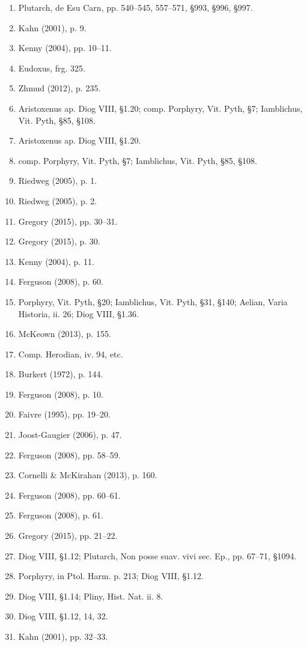 \begin{enumerate}
\item Plutarch, de Esu Carn, pp. 540–545, 557–571, §993, §996, §997.  
\item Kahn (2001), p. 9.  
\item Kenny (2004), pp. 10–11.  
\item Eudoxus, frg. 325.  
\item Zhmud (2012), p. 235.  
\item Aristoxenus ap. Diog VIII, §1.20; comp. Porphyry, Vit. Pyth, §7; Iamblichus, Vit. Pyth, §85, §108.  
\item Aristoxenus ap. Diog VIII, §1.20.  
\item comp. Porphyry, Vit. Pyth, §7; Iamblichus, Vit. Pyth, §85, §108.  
\item Riedweg (2005), p. 1.  
\item Riedweg (2005), p. 2.  
\item Gregory (2015), pp. 30–31.  
\item Gregory (2015), p. 30.  
\item Kenny (2004), p. 11.  
\item Ferguson (2008), p. 60.  
\item Porphyry, Vit. Pyth, §20; Iamblichus, Vit. Pyth, §31, §140; Aelian, Varia Historia, ii. 26; Diog VIII, §1.36.
\item McKeown (2013), p. 155.  
\item Comp. Herodian, iv. 94, etc.  
\item Burkert (1972), p. 144.  
\item Ferguson (2008), p. 10.  
\item Faivre (1995), pp. 19–20.  
\item Joost-Gaugier (2006), p. 47.  
\item Ferguson (2008), pp. 58–59.  
\item Cornelli & McKirahan (2013), p. 160.  
\item Ferguson (2008), pp. 60–61.  
\item Ferguson (2008), p. 61.  
\item Gregory (2015), pp. 21–22.  
\item Diog VIII, §1.12; Plutarch, Non posse suav. vivi sec. Ep., pp. 67–71, §1094.  
\item Porphyry, in Ptol. Harm. p. 213; Diog VIII, §1.12.  
\item Diog VIII, §1.14; Pliny, Hist. Nat. ii. 8.  
\item Diog VIII, §1.12, 14, 32.  
\item Kahn (2001), pp. 32–33.  

\end{enumerate}
